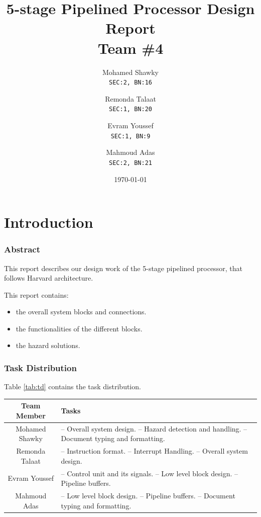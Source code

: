\documentclass[12pt]{report}
\title{\textbf{5-stage Pipelined Processor Design Report}\\Team \#4}
\author{
  Mohamed Shawky\\
  \small\texttt{SEC:2, BN:16}
  \and
  Remonda Talaat\\
  \small\texttt{SEC:1, BN:20}
  \and
  Evram Youssef\\
  \small\texttt{SEC:1, BN:9}
  \and
  Mahmoud Adas\\
  \small\texttt{SEC:2, BN:21}
}
\date{\today}
\begin{document}
\thispagestyle{empty}

\maketitle
\tableofcontents
\listoffigures
\listoftables
\clearpage


\part{Introduction}

\section{Abstract}
This report describes our design work of the 5-stage pipelined processor, that follows Harvard architecture.

This report contains:
\begin{itemize}
    \item the overall system blocks and connections.
    \item the functionalities of the different blocks.
    \item the hazard solutions.
\end{itemize}

\section{Task Distribution}
Table \ref{tab:td} contains the task distribution.

\begin{center}
 \begin{tabular}{||c| p{100mm}||} 
 \hline
 Team Member & Tasks \\ [0.5ex] 
 \hline\hline
 Mohamed Shawky & -- Overall system design. \newline -- Hazard detection and handling. \newline -- Document typing and formatting. \\
 \hline
 Remonda Talaat & -- Instruction format. \newline -- Interrupt Handling. \newline -- Overall system design. \\
 \hline
 Evram Youssef & -- Control unit and its signals. \newline -- Low level block design. \newline -- Pipeline buffers. \\
 \hline
 Mahmoud Adas & -- Low level block design. \newline -- Pipeline buffers. \newline -- Document typing and formatting. \\ 
 \hline
\end{tabular}
\end{center}
\end{document}
